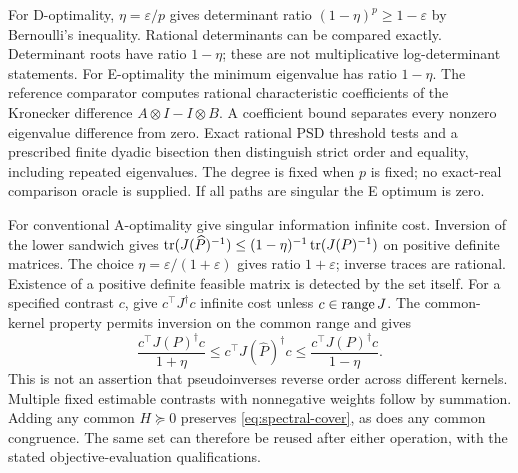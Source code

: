 For D-optimality, $\eta=\varepsilon/p$ gives determinant ratio
$(1-\eta)^p\ge1-\varepsilon$ by Bernoulli's inequality. Rational
determinants can be compared exactly. Determinant roots have ratio
$1-\eta$; these are not multiplicative log-determinant statements.
For E-optimality the minimum eigenvalue has ratio $1-\eta$. The reference
comparator computes rational characteristic coefficients of the Kronecker
difference $A\otimes I-I\otimes B$. A coefficient bound separates every
nonzero eigenvalue difference from zero. Exact rational PSD threshold tests
and a prescribed finite dyadic bisection then distinguish strict order and
equality, including repeated eigenvalues. The degree is fixed when $p$ is
fixed; no exact-real comparison oracle is supplied. If all paths are
singular the E optimum is zero.

For conventional A-optimality give singular information infinite cost.
Inversion of the lower sandwich gives
$\operatorname{tr}(J(\widehat P)^{-1})\le(1-\eta)^{-1}\operatorname{tr}(J(P)^{-1})$ on positive
definite matrices. The choice $\eta=\varepsilon/(1+\varepsilon)$ gives
ratio $1+\varepsilon$; inverse traces are rational. Existence of a positive
definite feasible matrix is detected by the set itself. For a specified
contrast $c$, give $c^\top J^\dagger c$ infinite cost unless
$c\in\operatorname{range} J$. The common-kernel property permits inversion on the
common range and gives
\[
 \frac{c^\top J(P)^\dagger c}{1+\eta}
 \le c^\top J(\widehat P)^\dagger c
 \le\frac{c^\top J(P)^\dagger c}{1-\eta}.
\]
This is not an assertion that pseudoinverses reverse order across different
kernels. Multiple fixed estimable contrasts with nonnegative weights follow
by summation. Adding any common $H\succeq0$ preserves
\eqref{eq:spectral-cover}, as does any common congruence. The same set can
therefore be reused after either operation, with the stated objective-evaluation
qualifications.

